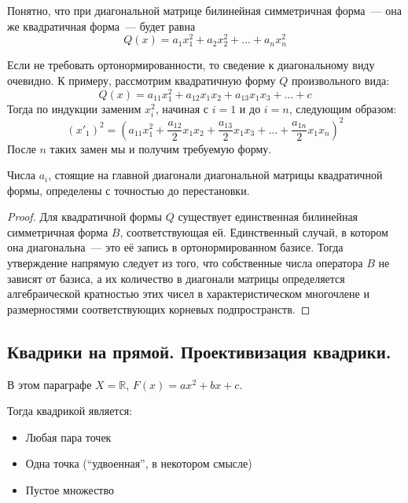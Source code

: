 \documentclass[11pt]{report}
\begin{document}
    \begin{remark}
    Понятно, что при диагональной матрице билинейная симметричная форма~--- она же квадратичная форма~--- будет равна
    \begin{equation*}
        Q(x) = a_1x_1^2 + a_2x_2^2 + \hdots + a_nx_n^2
    \end{equation*}
    \end{remark}

    \begin{remark}
    Если не требовать ортонормированности, то сведение к диагональному виду очевидно. К примеру, рассмотрим квадратичную форму $Q$ произвольного вида:
    \begin{equation*}
        Q(x) = a_{11}x_1^2 + a_{12}x_1x_2 + a_{13}x_1x_3 + \hdots + c
    \end{equation*}
    Тогда по индукции заменим $x_i^2$, начиная с $i = 1$ и до $i = n$, следующим образом:
    \begin{equation*}
        (x'_{1})^2 = (a_{11}x_1^2 + \dfrac{a_{12}}{2}x_1x_2 + \dfrac{a_{13}}{2}x_1x_3 + \hdots + \dfrac{a_{1n}}{2}x_1x_n)^2
    \end{equation*}
    После $n$ таких замен мы и получим требуемую форму.
    \end{remark}

    \begin{lemma}
    Числа $a_i$, стоящие на главной диагонали диагональной матрицы квадратичной формы, определены с точностью до перестановки.
    \end{lemma}

    \begin{proof}
    Для квадратичной формы $Q$ существует единственная билинейная симметричная форма $B$, соответствующая ей. Единственный случай, в котором она диагональна~--- это её запись в ортонормированном базисе. Тогда утверждение напрямую следует из того, что собственные числа оператора $B$ не зависят от базиса, а их количество в диагонали матрицы определяется алгебраической кратностью этих чисел в характеристическом многочлене и размерностями соответствующих корневых подпространств.
    \end{proof}

    \subsection{Квадрики на прямой. Проективизация квадрики.}
    В этом параграфе $X = \mathbb{R}$, $F(x) = ax^2 + bx + c$.

    Тогда квадрикой является:
    \begin{itemize}
        \item Любая пара точек
        \item Одна точка (``удвоенная'', в некотором смысле)
        \item Пустое множество
    \end{itemize}
\end{document}
